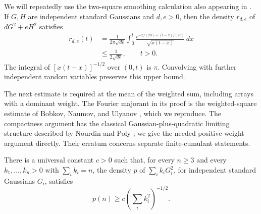 We will repeatedly use the two-square smoothing calculation also appearing in
\cite[Eq.~(7)]{BobkovNaumovUlyanov2021}.  If $G,H$ are
independent standard Gaussians and $d,e>0$, then the density
$r_{d,e}$ of $dG^2+eH^2$ satisfies
\begin{equation}
\label{eq:two-square-density}
 \begin{split}
 r_{d,e}(t)
 &=
 \frac1{2\pi\sqrt{de}}
 \int_0^t
 \frac{e^{-x/(2d)-(t-x)/(2e)}}{\sqrt{x(t-x)}}\,dx\\
 &\le \frac1{2\sqrt{de}},
 \qquad t>0.
 \end{split}
\end{equation}
The integral of $[x(t-x)]^{-1/2}$ over $(0,t)$ is $\pi$.
Convolving with further independent random variables preserves this
upper bound.

The next estimate is required at the mean of the weighted sum, including
arrays with a dominant weight. The Fourier majorant in its proof is the
weighted-square estimate of Bobkov, Naumov, and Ulyanov
\cite[Lemma~3]{BobkovNaumovUlyanov2021}, which we reproduce.
The compactness argument has the classical Gaussian-plus-quadratic
limiting structure described by Nourdin and Poly
\cite[Theorem~3.1]{NourdinPoly2012SecondChaos}; we give the needed
positive-weight argument directly. Their erratum
\cite{NourdinPoly2012Erratum} concerns separate finite-cumulant statements.

\begin{lemma}
\label{lem:mean-density}
There is a universal constant $c>0$ such that, for every $n\ge3$ and
every $k_1,\ldots,k_n>0$ with $\sum_i k_i=n$, the density $p$ of
$\sum_i k_iG_i^2$, for independent standard Gaussians $G_i$, satisfies
\begin{equation}
\label{eq:mean-density}
 p(n)\ge c\left(\sum_i k_i^2\right)^{-1/2}.
\end{equation}
\end{lemma}

